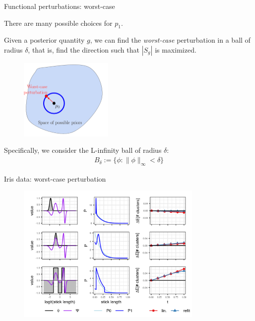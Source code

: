 \begin{frame}{Functional perturbations: worst-case}

There are many possible choices for $p_1$.

Given a posterior quantity $g$,
we can find the {\itshape worst-case} perturbation in a ball of
radius $\delta$, that is, find the direction such that
$|S_g|$ is maximized.

\vspace{-1em}

\begin{figure}[!h]
\centering
\includegraphics[width = 0.4\textwidth]{./figures/static_figures/functional_perturbation_worst_case.png}
\setlength{\textfloatsep}{-10pt}
\end{figure}

\vspace{-1em}

Specifically, we consider the L-infinity ball of radius $\delta$:
\begin{align*}
  B_\delta := \{\phi : \|\phi\|_\infty < \delta\}
\end{align*}

\end{frame}

\begin{frame}{Iris data: worst-case perturbation}
  \begin{figure}[!h]
    \centering
    \includegraphics[width = 0.8\textwidth]{./figures/iris_worst_case.png}
\end{figure}
\end{frame}

